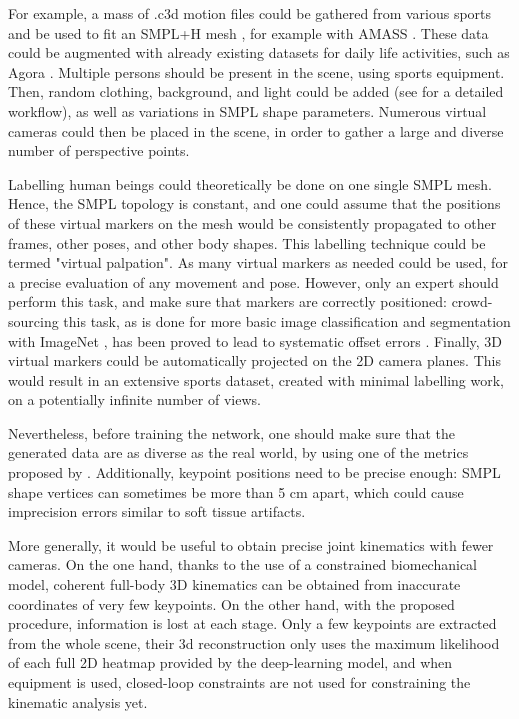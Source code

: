 For example, a mass of .c3d motion files could be gathered from various sports and be used to fit an SMPL+H mesh \cite{Pavlakos2019}, for example with AMASS \cite{Mahmood2019}. These data could be augmented with already existing datasets for daily life activities, such as Agora \cite{Patel2021}. Multiple persons should be present in the scene, using sports equipment. Then, random clothing, background, and light could be added (see \cite{Wood2021,Bolanos2021} for a detailed workflow), as well as variations in SMPL shape parameters. Numerous virtual cameras could then be placed in the scene, in order to gather a large and diverse number of perspective points.

Labelling human beings could theoretically be done on one single SMPL mesh. Hence, the SMPL topology is constant, and one could assume that the positions of these virtual markers on the mesh would be consistently propagated to other frames, other poses, and other body shapes. This labelling technique could be termed "virtual palpation". As many virtual markers as needed could be used, for a precise evaluation of any movement and pose. However, only an expert should perform this task, and make sure that markers are correctly positioned: crowd-sourcing this task, as is done for more basic image classification and segmentation with ImageNet \cite{Deng2009}, has been proved to lead to systematic offset errors \cite{Needham2021b}. Finally, 3D virtual markers could be automatically projected on the 2D camera planes. This would result in an extensive sports dataset, created with minimal labelling work, on a potentially infinite number of views. 

Nevertheless, before training the network, one should make sure that the generated data are as diverse as the real world, by using one of the metrics proposed by \cite{Borji2019, Borji2022}. Additionally, keypoint positions need to be precise enough: SMPL shape vertices can sometimes be more than 5 cm apart, which could cause imprecision errors similar to soft tissue artifacts. 

\vspace*{1.5cm}
More generally, it would be useful to obtain precise joint kinematics with fewer cameras. On the one hand, thanks to the use of a constrained biomechanical model, coherent full-body 3D kinematics can be obtained from inaccurate coordinates of very few keypoints. On the other hand, with the proposed procedure, information is lost at each stage. Only a few keypoints are extracted from the whole scene, their 3d reconstruction only uses the maximum likelihood of each full 2D heatmap provided by the deep-learning model, and when equipment is used, closed-loop constraints are not used for constraining the kinematic analysis yet.

